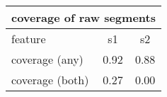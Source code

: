 \documentclass{standalone}
\begin{document}
\begin{tabular}{|l|c|c|}
\hline
\multicolumn{3}{|c|}{\textbf{coverage of raw segments}}\\
\hline 

feature & s1 & s2 \\
\hline
coverage (any) & 0.92 & 0.88 \\
coverage (both) & 0.27 & 0.00 \\
\hline
\end{tabular}
\end{document}
